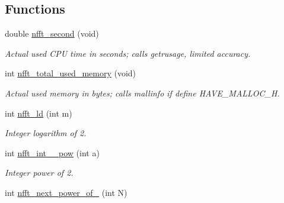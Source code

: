 \subsection*{Functions}
\begin{CompactItemize}
\item 
double \hyperlink{group__nfftutil_gae7e89f8691419d4a5bc972db7a3abd7}{nfft\_\-second} (void)
\begin{CompactList}\small\item\em Actual used CPU time in seconds; calls getrusage, limited accuracy. \item\end{CompactList}\item 
\hypertarget{group__nfftutil_g28fb58b4b760f463c6f32d4f04fec5cc}{
int \hyperlink{group__nfftutil_g28fb58b4b760f463c6f32d4f04fec5cc}{nfft\_\-total\_\-used\_\-memory} (void)}
\label{group__nfftutil_g28fb58b4b760f463c6f32d4f04fec5cc}

\begin{CompactList}\small\item\em Actual used memory in bytes; calls mallinfo if define HAVE\_\-MALLOC\_\-H. \item\end{CompactList}\item 
\hypertarget{group__nfftutil_ga92817fc5f0782104ffa89d39832af0d}{
int \hyperlink{group__nfftutil_ga92817fc5f0782104ffa89d39832af0d}{nfft\_\-ld} (int m)}
\label{group__nfftutil_ga92817fc5f0782104ffa89d39832af0d}

\begin{CompactList}\small\item\em Integer logarithm of 2. \item\end{CompactList}\item 
\hypertarget{group__nfftutil_g88a881909b8dfa742b00610b612fc679}{
int \hyperlink{group__nfftutil_g88a881909b8dfa742b00610b612fc679}{nfft\_\-int\_\_\-pow} (int a)}
\label{group__nfftutil_g88a881909b8dfa742b00610b612fc679}

\begin{CompactList}\small\item\em Integer power of 2. \item\end{CompactList}\item 
\hypertarget{group__nfftutil_g1de4c3bcd3ccd83cca45b93169c7b7af}{
int \hyperlink{group__nfftutil_g1de4c3bcd3ccd83cca45b93169c7b7af}{nfft\_\-next\_\-power\_\-of\_} (int N)}
\label{group__nfftutil_g1de4c3bcd3ccd83cca45b93169c7b7af}


\end{CompactItemize}
